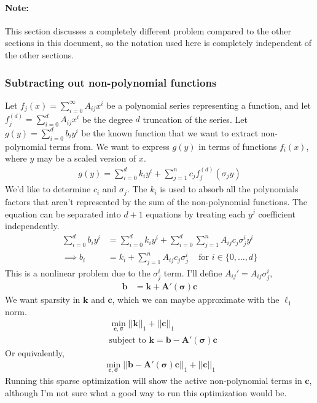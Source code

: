 \documentclass{article}
\let\vec\mathbf
\begin{document}
\paragraph{Note:} This section discusses a completely different problem compared to the other
sections in this document, so the notation used here is completely independent
of the other sections.

\subsubsection{Subtracting out non-polynomial functions}

Let $f_j(x) = \sum_{i=0}^\infty A_{ij} x^i$ be a polynomial series representing a function,
and let $f_j^{(d)} = \sum_{i=0}^d A_{ij} x^i$ be the degree $d$ truncation of
the series. Let $g(y) = \sum_{i=0}^d b_i y^i$ be the known function that we want
to extract non-polynomial terms from. We want to express $g(y)$ in terms of
functions $f_i(x)$, where $y$ may be a scaled version of $x$.
\begin{align*}
g(y) = \sum_{i=0}^d k_i y^i + \sum_{j=1}^n c_j f_j^{(d)}(\sigma_j y)
\end{align*}
We'd like to determine $c_i$ and $\sigma_j$. The $k_i$ is used to absorb all the
polynomials factors that aren't represented by the sum of the non-polynomial
functions. The equation can be separated into $d+1$ equations by treating each
$y^j$ coefficient independently.
\begin{align*}
\sum_{i=0}^d b_i y^i &= \sum_{i=0}^d k_i y^i + \sum_{i=0}^d \sum_{j=1}^n A_{ij} c_j \sigma_j^i y^i
\\ \implies b_i &= k_i + \sum_{j=1}^n A_{ij} c_j \sigma_j^i
\,\,\,\,\, \text{ for $i \in \{0, \hdots, d\}$}
\end{align*}
This is a nonlinear problem due to the $\sigma_j^i$ term. I'll define $A_{ij}' = A_{ij} \sigma^i_j$,
\begin{align*}
\vec{b} &= \vec{k} + \vec{A}'(\vec{\sigma}) \vec{c}
\end{align*}
We want sparsity in $\vec{k}$ and $\vec{c}$, which we can maybe approximate with
the $\ell_1$ norm.
\begin{align*}
&\min_{\vec{c},\vec{\sigma}} ||\vec{k}||_1 + ||\vec{c}||_1
\\& \text{subject to } \vec{k} =  \vec{b} - \vec{A}'(\vec{\sigma})\vec{c}
\end{align*}
Or equivalently,
\begin{align*}
\min_{\vec{c},\vec{\sigma}} ||\vec{b} - \vec{A}'(\vec{\sigma})\vec{c}||_1 + ||\vec{c}||_1
\end{align*}
Running this sparse optimization will show the active non-polynomial terms in
$\vec{c}$, although I'm not sure what a good way to run this optimization would
be.
\end{document}
